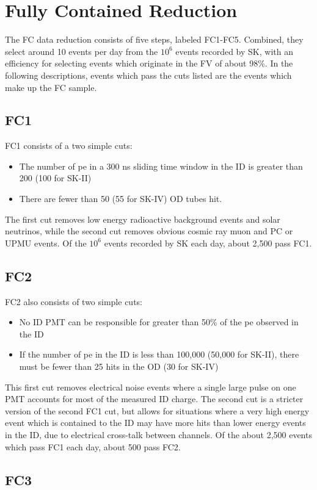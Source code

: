 \section{Fully Contained Reduction}
\label{sec:FC}
The FC data reduction consists of five steps, labeled FC1-FC5.  Combined, they select around 10 events per day from the $10^6$ events recorded by SK, with an efficiency for selecting events which originate in the FV of about 98\%.  In the following descriptions, events which pass the cuts listed are the events which make up the FC sample.
\subsection{FC1}
FC1 consists of a two simple cuts:
\begin{itemize}
\item The number of pe in a 300 ns sliding time window in the ID is greater than 200 (100 for SK-II)
\item There are fewer than 50 (55 for SK-IV) OD tubes hit.
\end{itemize}
The first cut removes low energy radioactive background events and solar neutrinos, while the second cut removes obvious cosmic ray muon and PC or UPMU events.  Of the $10^6$ events recorded by SK each day, about 2,500 pass FC1.

\subsection{FC2}
FC2 also consists of two simple cuts:
\begin{itemize}
\item No ID PMT can be responsible for greater than 50\% of the pe observed in the ID
\item If the number of pe in the ID is less than 100,000 (50,000 for SK-II), there must be fewer than 25 hits in the OD (30 for SK-IV)
\end{itemize}
This first cut removes electrical noise events where a single large pulse on one PMT accounts for most of the measured ID charge.  The second cut is a stricter version of the second FC1 cut, but allows for situations where a very high energy event which is contained to the ID may have more hits than lower energy events in the ID, due to electrical cross-talk between channels.  Of the about 2,500 events which pass FC1 each day, about 500 pass FC2.

\subsection{FC3}
